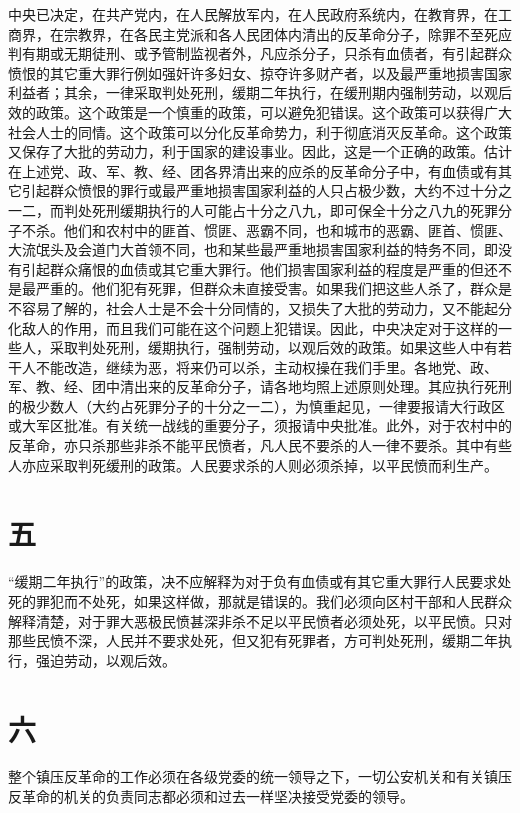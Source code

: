 中央已决定，在共产党内，在人民解放军内，在人民政府系统内，在教育界，在工商界，在宗教界，在各民主党派和各人民团体内清出的反革命分子，除罪不至死应判有期或无期徒刑、或予管制监视者外，凡应杀分子，只杀有血债者，有引起群众愤恨的其它重大罪行例如强奸许多妇女、掠夺许多财产者，以及最严重地损害国家利益者；其余，一律采取判处死刑，缓期二年执行，在缓刑期内强制劳动，以观后效的政策。这个政策是一个慎重的政策，可以避免犯错误。这个政策可以获得广大社会人士的同情。这个政策可以分化反革命势力，利于彻底消灭反革命。这个政策又保存了大批的劳动力，利于国家的建设事业。因此，这是一个正确的政策。估计在上述党、政、军、教、经、团各界清出来的应杀的反革命分子中，有血债或有其它引起群众愤恨的罪行或最严重地损害国家利益的人只占极少数，大约不过十分之一二，而判处死刑缓期执行的人可能占十分之八九，即可保全十分之八九的死罪分子不杀。他们和农村中的匪首、惯匪、恶霸不同，也和城市的恶霸、匪首、惯匪、大流氓头及会道门大首领不同，也和某些最严重地损害国家利益的特务不同，即没有引起群众痛恨的血债或其它重大罪行。他们损害国家利益的程度是严重的但还不是最严重的。他们犯有死罪，但群众未直接受害。如果我们把这些人杀了，群众是不容易了解的，社会人士是不会十分同情的，又损失了大批的劳动力，又不能起分化敌人的作用，而且我们可能在这个问题上犯错误。因此，中央决定对于这样的一些人，采取判处死刑，缓期执行，强制劳动，以观后效的政策。如果这些人中有若干人不能改造，继续为恶，将来仍可以杀，主动权操在我们手里。各地党、政、军、教、经、团中清出来的反革命分子，请各地均照上述原则处理。其应执行死刑的极少数人（大约占死罪分子的十分之一二），为慎重起见，一律要报请大行政区或大军区批准。有关统一战线的重要分子，须报请中央批准。此外，对于农村中的反革命，亦只杀那些非杀不能平民愤者，凡人民不要杀的人一律不要杀。其中有些人亦应采取判死缓刑的政策。人民要求杀的人则必须杀掉，以平民愤而利生产。

\date{一九五一年六月十五日}
\section*{五}

“缓期二年执行”的政策，决不应解释为对于负有血债或有其它重大罪行人民要求处死的罪犯而不处死，如果这样做，那就是错误的。我们必须向区村干部和人民群众解释清楚，对于罪大恶极民愤甚深非杀不足以平民愤者必须处死，以平民愤。只对那些民愤不深，人民并不要求处死，但又犯有死罪者，方可判处死刑，缓期二年执行，强迫劳动，以观后效。

\date{一九五一年九月十日}
\section*{六}

整个镇压反革命的工作必须在各级党委的统一领导之下，一切公安机关和有关镇压反革命的机关的负责同志都必须和过去一样坚决接受党委的领导。
